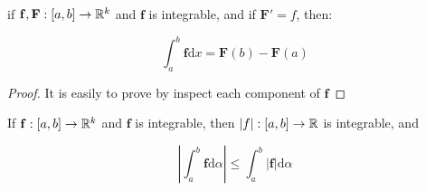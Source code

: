 \begin{thm}
    if $\mathbf{f}, \mathbf{F}: [a,b] \to \mathbb{R}^k$   and $\mathbf{f}$ is integrable, and if $\mathbf{F}' = f$,
    then:

    \[
        \int_a^b \mathbf{f} \mathrm{d}x = \mathbf{F}(b) - \mathbf{F}(a)
    \]
\end{thm}

\begin{proof}
    It is easily to prove by inspect each component of $\mathbf{f}$
\end{proof}

\begin{thm}
    If $\mathbf{f}: [a,b] \to \mathbb{R}^k$ and $\mathbf{f}$ is integrable, then $\left| f \right|: [a,b] \to \mathbb{R}$ is integrable,
    and 
    
    \[
        \left| \int_a^b \mathbf{f} \mathrm{d} \alpha \right| \le \int_a^b  \left|\mathbf{f} \right|\mathrm{d} \alpha
    \]
\end{thm}

